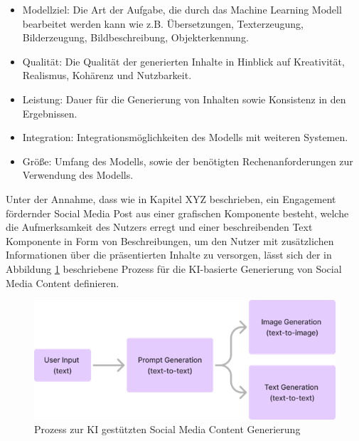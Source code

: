 \begin{itemize}
    \item Modellziel: Die Art der Aufgabe, die durch das Machine Learning Modell bearbeitet werden kann wie z.B. Übersetzungen, Texterzeugung, Bilderzeugung, Bildbeschreibung, Objekterkennung.
    \item Qualität: Die Qualität der generierten Inhalte in Hinblick auf Kreativität, Realismus, Kohärenz und Nutzbarkeit.
    \item Leistung: Dauer für die Generierung von Inhalten sowie Konsistenz in den Ergebnissen.
    \item Integration: Integrationsmöglichkeiten des Modells mit weiteren Systemen.
    \item Größe: Umfang des Modells, sowie der benötigten Rechenanforderungen zur Verwendung des Modells.
\end{itemize}

Unter der Annahme, dass wie in Kapitel XYZ beschrieben, ein Engagement fördernder Social Media Post aus einer grafischen Komponente besteht, welche die Aufmerksamkeit des Nutzers erregt und einer beschreibenden Text Komponente in Form von Beschreibungen, um den Nutzer mit zusätzlichen Informationen über die präsentierten Inhalte zu versorgen, lässt sich der in Abbildung \ref{fig:process_content_generation} beschriebene Prozess für die KI-basierte Generierung von Social Media Content definieren.
\begin{figure}[htbp]
    \centering
    \includegraphics[width=\textwidth]{abbildungen/Process_image_generation}
    \caption{Prozess zur KI gestützten Social Media Content Generierung}
    \label{fig:process_content_generation}
\end{figure}


